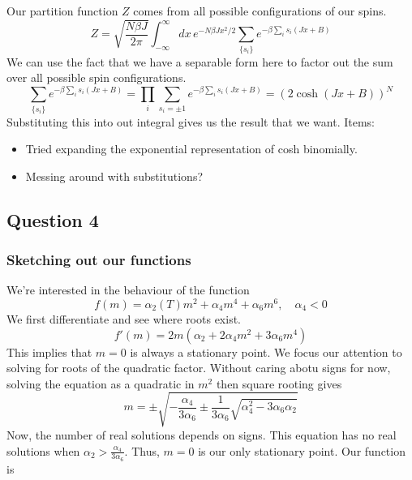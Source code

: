 \documentclass[11pt, oneside]{article}   	%
\begin{document}
Our partition function $Z$ comes from all possible configurations of our spins. 
\[	
Z = \sqrt{\frac{N \beta J}{2 \pi}} \int_{-\infty}^{\infty} dx \, e^{ - N \beta J x^2  / 2} \sum_{\{ s_i \}} e^{ - \beta \sum_i s_i (Jx +B)} 
\]
We can use the fact that we have a separable form here to factor out the sum over all possible spin configurations. 
\[	
\sum_{\{ s_i \}} e^{ - \beta \sum_i s_i (Jx + B) } = \prod_{i}\sum_{s_i = \pm 1} e^{ - \beta \sum_i s_i (Jx + B)} = (2 \cosh (Jx  +B))^N 
\]
Substituting this into out integral gives us the result that we want.
Items:
\begin{itemize}
\item Tried expanding the exponential representation of cosh binomially. 
\item Messing around with substitutions?
\end{itemize}

\pagebreak 
\subsection{Question 4}

\subsubsection*{Sketching out our functions} 
We're interested in the behaviour of the function 
\[ 
f(m) = \alpha_2 (T) m^2 + \alpha_4 m^4 + \alpha_6 m^6, \quad \alpha_4 < 0 
\] We first differentiate and see where roots exist. 
\[
f ' ( m ) = 2 m ( \alpha_2 + 2 \alpha_4 m^2 + 3 \alpha_6 m ^ 4 ) 
\] This implies that $ m = 0 $ is always a stationary point. 
We focus our attention to solving for roots of the quadratic factor. 
Without caring abotu signs for now, solving the equation as 
a quadratic in $ m^ 2 $ then square rooting gives 
\[
m = \pm \sqrt{  - \frac{\alpha_4 }{3 \alpha_6 } \pm  \frac{1}{ 3 \alpha_6 } \sqrt{ \alpha_4^2 - 3 \alpha_6 \alpha_2 }} 
\] Now, the number of real solutions depends on signs. 
This equation has no real solutions when $ \alpha_2 > \frac{ \alpha_4 }{ 3 \alpha_6 }$. 
Thus, $ m = 0 $ is our only stationary point. Our function is 

\begin{figure}[h]
\centering
{} 
\end{figure} 
\end{document}
